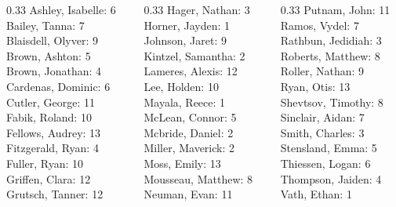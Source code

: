 \documentclass[10pt]{beamer}
\begin{document}
\begin{frame}
\small 
\begin{columns}
\begin{column}{0.33\textwidth}
Ashley, Isabelle: 6 \\ 
Bailey, Tanna: 7 \\ 
Blaisdell, Olyver: 9 \\ 
Brown, Ashton: 5 \\ 
Brown, Jonathan: 4 \\ 
Cardenas, Dominic: 6 \\ 
Cutler, George: 11 \\ 
Fabik, Roland: 10 \\ 
Fellows, Audrey: 13 \\ 
Fitzgerald, Ryan: 4 \\ 
Fuller, Ryan: 10 \\ 
Griffen, Clara: 12 \\ 
Grutsch, Tanner: 12 \\\end{column}
\begin{column}{0.33\textwidth}
Hager, Nathan: 3 \\ 
Horner, Jayden: 1 \\ 
Johnson, Jaret: 9 \\ 
Kintzel, Samantha: 2 \\ 
Lameres, Alexis: 12 \\ 
Lee, Holden: 10 \\ 
Mayala, Reece: 1 \\ 
McLean, Connor: 5 \\ 
Mcbride, Daniel: 2 \\ 
Miller, Maverick: 2 \\ 
Moss, Emily: 13 \\ 
Mousseau, Matthew: 8 \\ 
Neuman, Evan: 11 \\\end{column}
\begin{column}{0.33\textwidth}
Putnam, John: 11 \\ 
Ramos, Vydel: 7 \\ 
Rathbun, Jedidiah: 3 \\ 
Roberts, Matthew: 8 \\ 
Roller, Nathan: 9 \\ 
Ryan, Otis: 13 \\ 
Shevtsov, Timothy: 8 \\ 
Sinclair, Aidan: 7 \\ 
Smith, Charles: 3 \\ 
Stensland, Emma: 5 \\ 
Thiessen, Logan: 6 \\ 
Thompson, Jaiden: 4 \\ 
Vath, Ethan: 1 \\\end{column}
\end{columns}
\end{frame}
\end{document}

